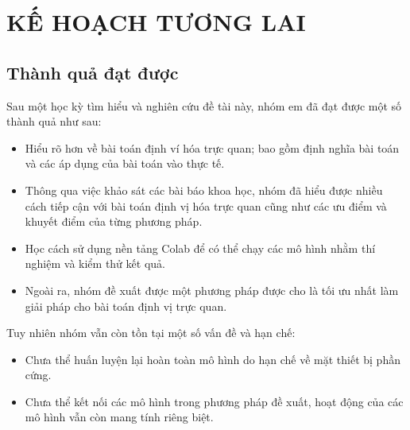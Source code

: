 \chapter{KẾ HOẠCH TƯƠNG LAI}
\section{Thành quả đạt được}
Sau một học kỳ tìm hiểu và nghiên cứu đề tài này, nhóm em đã đạt được một số thành quả như sau:
\begin{itemize}
	\item Hiểu rõ hơn về bài toán định ví hóa trực quan; bao gồm định nghĩa bài toán và các áp dụng của bài toán vào thực tế.
	\item Thông qua việc khảo sát các bài báo khoa học, nhóm đã hiểu được nhiều cách tiếp cận với bài toán định vị hóa trực quan cũng như các ưu điểm và khuyết điểm của từng phương pháp.
	\item Học cách sử dụng nền tảng Colab để có thể chạy các mô hình nhằm thí nghiệm và kiểm thử kết quả.
	\item Ngoài ra, nhóm đề xuất được một phương pháp được cho là tối ưu nhất làm giải pháp cho bài toán định vị trực quan.
\end{itemize} 
Tuy nhiên nhóm vẫn còn tồn tại một số vấn đề và hạn chế:
\begin{itemize}
	\item Chưa thể huấn luyện lại hoàn toàn mô hình do hạn chế về mặt thiết bị phần cứng.
	\item Chưa thể kết nối các mô hình trong phương pháp đề xuất, hoạt động của các mô hình vẫn còn mang tính riêng biệt.
\end{itemize}

